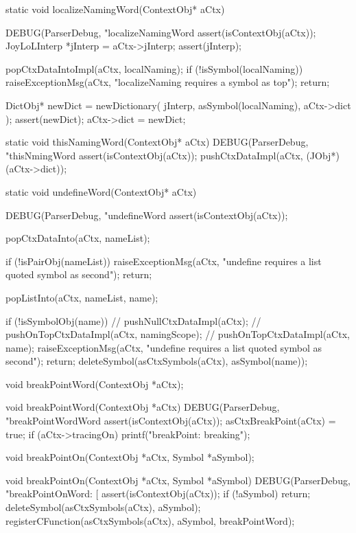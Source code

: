 \startCCode
static void localizeNamingWord(ContextObj* aCtx) {
  DEBUG(ParserDebug, "localizeNamingWord%
  assert(isContextObj(aCtx));
  JoyLoLInterp *jInterp = aCtx->jInterp;
  assert(jInterp);
  
  popCtxDataIntoImpl(aCtx, localNaming);
  if (!isSymbol(localNaming)){
    raiseExceptionMsg(aCtx,
      "localizeNaming requires a symbol as top");
    return;
  }
  
  DictObj* newDict = 
    newDictionary(
      jInterp,
      asSymbol(localNaming),
      aCtx->dict
    );
  assert(newDict);
  aCtx->dict = newDict;
}
\stopCCode

\startCCode
static void thisNamingWord(ContextObj* aCtx) {
  DEBUG(ParserDebug, "thisNmingWord%
  assert(isContextObj(aCtx));
  pushCtxDataImpl(aCtx, (JObj*)(aCtx->dict));
}
\stopCCode
\stoptyping

\startCCode
static void undefineWord(ContextObj* aCtx) {
  DEBUG(ParserDebug, "undefineWord%
  assert(isContextObj(aCtx));
  
  popCtxDataInto(aCtx, nameList);

  if (!isPairObj(nameList)) {
    raiseExceptionMsg(aCtx,
      "undefine requires a list quoted symbol as second");
    return;
  }
  
  popListInto(aCtx, nameList, name);
  
  if (!isSymbolObj(name)) {
//    pushNullCtxDataImpl(aCtx);
//    pushOnTopCtxDataImpl(aCtx, namingScope);
//    pushOnTopCtxDataImpl(aCtx, name);
    raiseExceptionMsg(aCtx,
      "undefine requires a list quoted symbol as second");
    return;
  }
  deleteSymbol(asCtxSymbols(aCtx), asSymbol(name));
  }
\stopCCode


\startCHeader
void breakPointWord(ContextObj *aCtx);
\stopCHeader

\startCCode
void breakPointWord(ContextObj *aCtx) {
  DEBUG(ParserDebug, "breakPointWordWord%
  assert(isContextObj(aCtx));
  asCtxBreakPoint(aCtx) = true;
  if (aCtx->tracingOn) printf("breakPoint: breaking\n");
}
\stopCCode

\startCHeader
void breakPointOn(ContextObj *aCtx, Symbol *aSymbol);
\stopCHeader

\startCCode
void breakPointOn(ContextObj *aCtx, Symbol *aSymbol) {
  DEBUG(ParserDebug, "breakPointOnWord: [%
  assert(isContextObj(aCtx));
  if (!aSymbol) return;
  deleteSymbol(asCtxSymbols(aCtx), aSymbol);
  registerCFunction(asCtxSymbols(aCtx), aSymbol, breakPointWord);
}
\stopCCode

